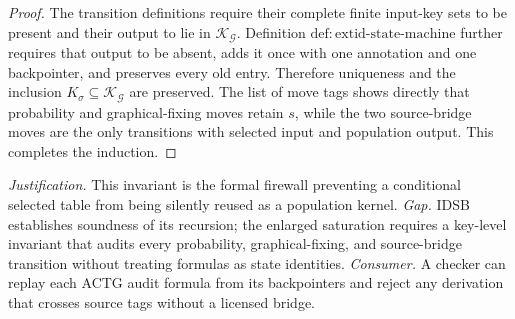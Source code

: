 \documentclass{article}
\begin{document}
\begin{proof}
The transition definitions require their complete finite input-key sets to be present and their output to lie in \(\mathscr K_{\mathcal G}\).  Definition \(\mathrm{def{:}extid\text{-}state\text{-}machine}\) further requires that output to be absent, adds it once with one annotation and one backpointer, and preserves every old entry.  Therefore uniqueness and the inclusion \(K_\sigma\subseteq\mathscr K_{\mathcal G}\) are preserved.  The list of move tags shows directly that probability and graphical-fixing moves retain \(s\), while the two source-bridge moves are the only transitions with selected input and population output.  This completes the induction.
\end{proof}
\par\smallskip\noindent \textit{Justification.} This invariant is the formal firewall preventing a conditional selected table from being silently reused as a population kernel. \textit{Gap.} IDSB establishes soundness of its recursion; the enlarged saturation requires a key-level invariant that audits every probability, graphical-fixing, and source-bridge transition without treating formulas as state identities. \textit{Consumer.} A checker can replay each ACTG audit formula from its backpointers and reject any derivation that crosses source tags without a licensed bridge.
\end{document}

